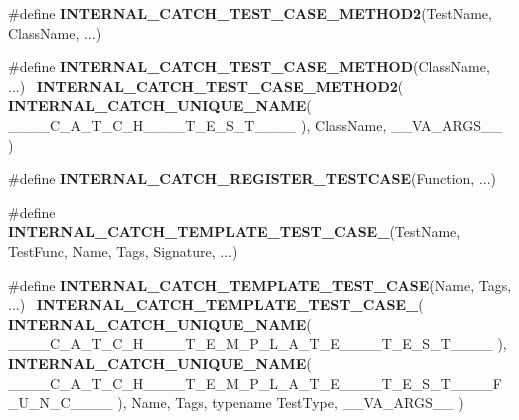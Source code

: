 \begin{DoxyCompactItemize}
\#define \textbf{ I\+N\+T\+E\+R\+N\+A\+L\+\_\+\+C\+A\+T\+C\+H\+\_\+\+T\+E\+S\+T\+\_\+\+C\+A\+S\+E\+\_\+\+M\+E\+T\+H\+O\+D2}(Test\+Name,  Class\+Name, ...)
\item 
\#define \textbf{ I\+N\+T\+E\+R\+N\+A\+L\+\_\+\+C\+A\+T\+C\+H\+\_\+\+T\+E\+S\+T\+\_\+\+C\+A\+S\+E\+\_\+\+M\+E\+T\+H\+OD}(Class\+Name, ...)~\textbf{ I\+N\+T\+E\+R\+N\+A\+L\+\_\+\+C\+A\+T\+C\+H\+\_\+\+T\+E\+S\+T\+\_\+\+C\+A\+S\+E\+\_\+\+M\+E\+T\+H\+O\+D2}( \textbf{ I\+N\+T\+E\+R\+N\+A\+L\+\_\+\+C\+A\+T\+C\+H\+\_\+\+U\+N\+I\+Q\+U\+E\+\_\+\+N\+A\+ME}( \+\_\+\+\_\+\+\_\+\+\_\+\+C\+\_\+\+A\+\_\+\+T\+\_\+\+C\+\_\+\+H\+\_\+\+\_\+\+\_\+\+\_\+\+T\+\_\+\+E\+\_\+\+S\+\_\+\+T\+\_\+\+\_\+\+\_\+\+\_\+ ), Class\+Name, \+\_\+\+\_\+\+V\+A\+\_\+\+A\+R\+G\+S\+\_\+\+\_\+ )
\item 
\#define \textbf{ I\+N\+T\+E\+R\+N\+A\+L\+\_\+\+C\+A\+T\+C\+H\+\_\+\+R\+E\+G\+I\+S\+T\+E\+R\+\_\+\+T\+E\+S\+T\+C\+A\+SE}(Function, ...)
\item 
\#define \textbf{ I\+N\+T\+E\+R\+N\+A\+L\+\_\+\+C\+A\+T\+C\+H\+\_\+\+T\+E\+M\+P\+L\+A\+T\+E\+\_\+\+T\+E\+S\+T\+\_\+\+C\+A\+S\+E\+\_}(Test\+Name,  Test\+Func,  Name,  Tags,  Signature, ...)
\item 
\#define \textbf{ I\+N\+T\+E\+R\+N\+A\+L\+\_\+\+C\+A\+T\+C\+H\+\_\+\+T\+E\+M\+P\+L\+A\+T\+E\+\_\+\+T\+E\+S\+T\+\_\+\+C\+A\+SE}(Name,  Tags, ...)~\textbf{ I\+N\+T\+E\+R\+N\+A\+L\+\_\+\+C\+A\+T\+C\+H\+\_\+\+T\+E\+M\+P\+L\+A\+T\+E\+\_\+\+T\+E\+S\+T\+\_\+\+C\+A\+S\+E\+\_}( \textbf{ I\+N\+T\+E\+R\+N\+A\+L\+\_\+\+C\+A\+T\+C\+H\+\_\+\+U\+N\+I\+Q\+U\+E\+\_\+\+N\+A\+ME}( \+\_\+\+\_\+\+\_\+\+\_\+\+C\+\_\+\+A\+\_\+\+T\+\_\+\+C\+\_\+\+H\+\_\+\+\_\+\+\_\+\+\_\+\+T\+\_\+\+E\+\_\+\+M\+\_\+\+P\+\_\+\+L\+\_\+\+A\+\_\+\+T\+\_\+\+E\+\_\+\+\_\+\+\_\+\+\_\+\+T\+\_\+\+E\+\_\+\+S\+\_\+\+T\+\_\+\+\_\+\+\_\+\+\_\+ ), \textbf{ I\+N\+T\+E\+R\+N\+A\+L\+\_\+\+C\+A\+T\+C\+H\+\_\+\+U\+N\+I\+Q\+U\+E\+\_\+\+N\+A\+ME}( \+\_\+\+\_\+\+\_\+\+\_\+\+C\+\_\+\+A\+\_\+\+T\+\_\+\+C\+\_\+\+H\+\_\+\+\_\+\+\_\+\+\_\+\+T\+\_\+\+E\+\_\+\+M\+\_\+\+P\+\_\+\+L\+\_\+\+A\+\_\+\+T\+\_\+\+E\+\_\+\+\_\+\+\_\+\+\_\+\+T\+\_\+\+E\+\_\+\+S\+\_\+\+T\+\_\+\+\_\+\+\_\+\+\_\+\+F\+\_\+\+U\+\_\+\+N\+\_\+\+C\+\_\+\+\_\+\+\_\+\+\_\+ ), Name, Tags, typename Test\+Type, \+\_\+\+\_\+\+V\+A\+\_\+\+A\+R\+G\+S\+\_\+\+\_\+ )
\item 

\end{DoxyCompactItemize}
